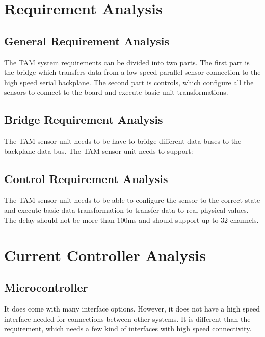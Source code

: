 \documentclass[12pt,article]{memoir}
\begin{document}
\chapter{Requirement Analysis}
\section{General Requirement Analysis}
The TAM system requirements can be divided into two parts. The first part is the bridge which transfers data from a low speed parallel sensor connection to the high speed serial backplane. The second part is controls, which configure all the sensors to connect to the board and execute basic unit transformations.
\section{Bridge Requirement Analysis}
The TAM sensor unit needs to be have to bridge different data buses to the backplane data bus. The TAM sensor unit needs to support: 
\section{Control Requirement Analysis}
The TAM sensor unit needs to be able to configure the sensor to the correct state and execute basic data transformation to transfer data to real physical values. The delay should not be more than 100ms and should support up to 32 channels.
\newpage
\chapter{Current Controller Analysis}
\section{Microcontroller}
It does come with many interface options. However, it does not have a high speed interface needed for connections between other systems. It is different than the requirement, which needs a few kind of interfaces with high speed connectivity.
\end{document}

